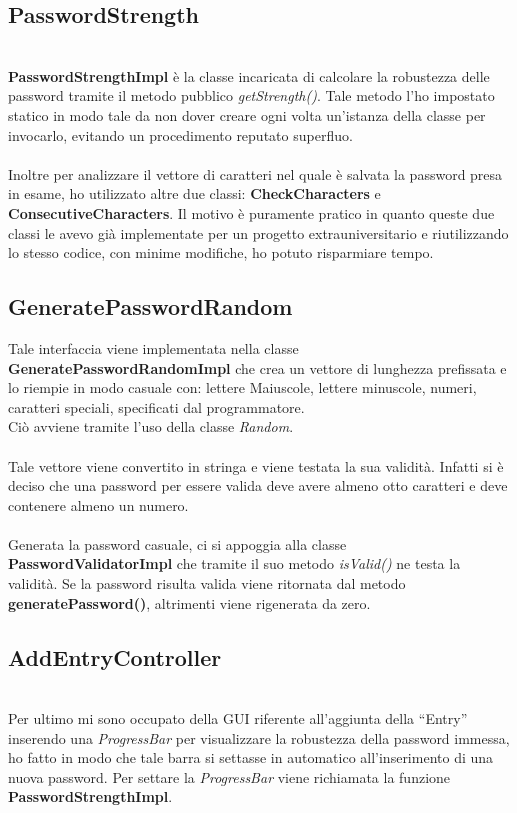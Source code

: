 \documentclass[a4paper,12pt]{report}
\begin{document}
\subsection*{PasswordStrength}
\\\textbf{PasswordStrengthImpl} è la classe incaricata di calcolare la robustezza delle password tramite il metodo pubblico \textit{getStrength()}. Tale metodo l’ho impostato statico in modo tale da non dover creare ogni volta un’istanza della classe per invocarlo, evitando un procedimento reputato superfluo.\\

\\Inoltre per analizzare il vettore di caratteri nel quale è salvata la password presa in esame, ho utilizzato altre due classi: \textbf{CheckCharacters} e \textbf{ConsecutiveCharacters}. Il motivo è puramente pratico in quanto queste due classi le avevo già implementate per un progetto extrauniversitario e riutilizzando lo stesso codice, con minime modifiche, ho potuto risparmiare tempo.\\


\subsection*{GeneratePasswordRandom}
Tale interfaccia viene implementata nella classe \textbf{GeneratePasswordRandomImpl} che crea un vettore di lunghezza prefissata e lo riempie in modo casuale con: lettere Maiuscole, lettere minuscole, numeri, caratteri speciali, specificati dal programmatore.
\\Ciò avviene tramite l’uso della classe \textit{Random}.\\

\\Tale vettore viene convertito in stringa e viene testata la sua validità. Infatti si è deciso che una password per essere valida deve avere almeno otto caratteri e deve contenere almeno un numero.\\

\\Generata la password casuale, ci si appoggia alla classe \textbf{PasswordValidatorImpl} che tramite il suo metodo \textit{isValid()} ne testa la validità.
Se la password risulta valida viene ritornata dal metodo \textbf{generatePassword()}, altrimenti viene rigenerata da zero.\\


\subsection*{AddEntryController}
\\Per ultimo mi sono occupato della GUI riferente all’aggiunta della “Entry” inserendo una \textit{ProgressBar} per visualizzare la robustezza della password immessa, ho fatto in modo che tale barra si settasse in automatico all’inserimento di una nuova password. Per settare la \textit{ProgressBar} viene richiamata la funzione \textbf{PasswordStrengthImpl}.
\end{document}
